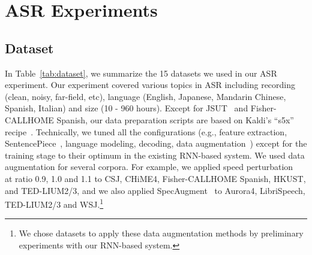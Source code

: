 \section{ASR Experiments}
\vspace{-2mm}
\subsection{Dataset}

In Table~\ref{tab:dataset}, we summarize the 15 datasets we used in our ASR experiment.
Our experiment covered various topics in ASR including recording (clean, noisy, far-field, etc), language (English, Japanese, Mandarin Chinese, Spanish, Italian) and size (10 - 960 hours).
Except for JSUT~\cite{jsut} and Fisher-CALLHOME Spanish, our data preparation scripts are based on Kaldi's ``s5x'' recipe~\cite{kaldi}.
Technically, we tuned all the configurations (e.g., feature extraction, SentencePiece~\cite{kudo-richardson-2018-sentencepiece}, language modeling, decoding, data augmentation~\cite{park2019specaugment,ko2015audio}) except for the training stage to their optimum in the existing RNN-based system.
We used data augmentation for several corpora. For example, we applied speed perturbation~\cite{ko2015audio} at ratio 0.9, 1.0 and 1.1 to CSJ, CHiME4, Fisher-CALLHOME Spanish, HKUST, and TED-LIUM2/3, and we also applied SpecAugment~\cite{park2019specaugment} to Aurora4, LibriSpeech, TED-LIUM2/3 and WSJ.\footnote{We chose datasets to apply these data augmentation methods by preliminary experiments with our RNN-based system.}

